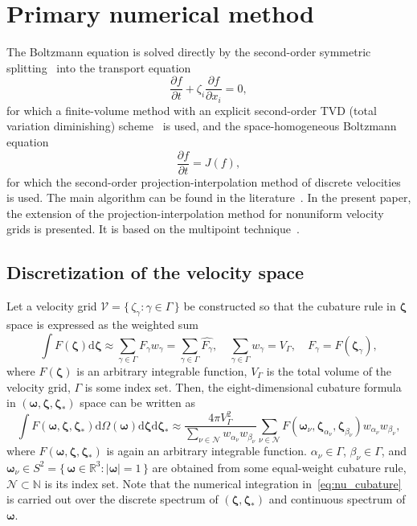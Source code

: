 \documentclass[]{elsarticle} %
\newcommand{\dd}{\mathrm{d}}
\newcommand{\pder}[2][]{\frac{\partial#1}{\partial#2}}
\newcommand{\dzeta}{\boldsymbol{\dd\zeta}}
\newcommand{\bzeta}{\boldsymbol{\zeta}}
\newcommand{\Nu}{\mathcal{N}}
\newcommand{\Set}[2]{\{\,{#1}:{#2}\,\}}
\begin{document}
\section{Primary numerical method}

The Boltzmann equation is solved directly by the second-order symmetric splitting~\citep{Strang1968,Bobylev2001}
into the transport equation
\begin{equation}\label{eq:split_transport}
    \pder[f]{t} + \zeta_i\pder[f]{x_i} = 0,
\end{equation}
for which a finite-volume method with
an explicit second-order TVD (total variation diminishing) scheme~\citep{Harten1983} is used,
and the space-homogeneous Boltzmann equation
\begin{equation}\label{eq:split_collisions}
    \pder[f]{t} = J(f),
\end{equation}
for which the second-order projection-interpolation method of discrete velocities is used.
The main algorithm can be found in the literature~\citep[see e.g.][]{Tcheremissine1998, Tcheremissine2006, Dodulad2015}.
In the present paper, the extension of the projection-interpolation method
for nonuniform velocity grids is presented.
It is based on the multipoint technique~\citep{Dodulad2012}.

\subsection{Discretization of the velocity space}

Let a velocity grid \(\mathcal{V} = \Set{\zeta_\gamma}{\gamma\in\Gamma}\) be constructed so that
the cubature rule in \(\bzeta\) space is expressed as the weighted sum
\begin{equation}\label{eq:bzeta_cubature}
    \int F(\bzeta) \dzeta \approx \sum_{\gamma\in\Gamma} F_\gamma w_\gamma =
        \sum_{\gamma\in\Gamma} \hat{F_\gamma}, \quad
    \sum_{\gamma\in\Gamma} w_\gamma = V_\Gamma, \quad
    F_\gamma = F(\bzeta_\gamma),
\end{equation}
where \(F(\bzeta)\) is an arbitrary integrable function,
\(V_\Gamma\) is the total volume of the velocity grid, \(\Gamma\) is some index set.
Then, the eight-dimensional cubature formula in \((\boldsymbol{\omega},\bzeta,\bzeta_*)\) space can be written as
\begin{equation}\label{eq:nu_cubature}
    \int F(\boldsymbol{\omega},\bzeta,\bzeta_*) \dd\Omega(\boldsymbol{\omega})\dzeta\dzeta_* \approx
        \frac{4\pi V_\Gamma^2}{ \sum_{\nu\in\Nu} w_{\alpha_\nu}w_{\beta_\nu} }
        \sum_{\nu\in\Nu} F(\boldsymbol{\omega}_\nu,\bzeta_{\alpha_\nu},\bzeta_{\beta_\nu}) w_{\alpha_\nu}w_{\beta_\nu},
\end{equation}
where \(F(\boldsymbol{\omega},\bzeta,\bzeta_*)\) is again an arbitrary integrable function.
\(\alpha_\nu\in\Gamma\), \(\beta_\nu\in\Gamma\),
and \(\boldsymbol{\omega}_\nu\in S^2 = \Set{\boldsymbol{\omega}\in\mathbb{R}^3}{|\boldsymbol{\omega}| = 1}\)
are obtained from some equal-weight cubature rule,
\(\Nu\subset\mathbb{N}\) is its index set.
Note that the numerical integration in~\eqref{eq:nu_cubature} is carried out over
the discrete spectrum of \((\bzeta,\bzeta_*)\) and continuous spectrum of \(\boldsymbol{\omega}\).
\end{document}
